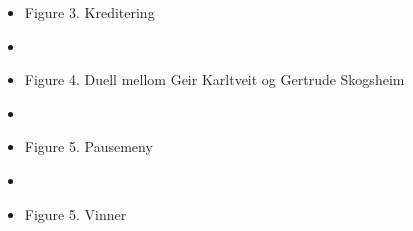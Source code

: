 \documentclass[paper=a4]{article}
\begin{document}
\begin{center}
{\begin{itemize}
				\item {\hfil Figure 3. Kreditering} 
				\bigskip
				\bigskip
				\bigskip
				\item{}
				\item {\hfil Figure 4. Duell mellom Geir Karltveit og Gertrude Skogsheim} 
				\bigskip
				\bigskip
				\bigskip
				\item{}
				\item {\hfil Figure 5. Pausemeny} 
				\bigskip
				\bigskip
				\bigskip
				\item{}
				\item {\hfil Figure 5. Vinner} 
				\bigskip
				\bigskip
				\bigskip
			\end{itemize}
		}
	\end{center}
\end{document}

